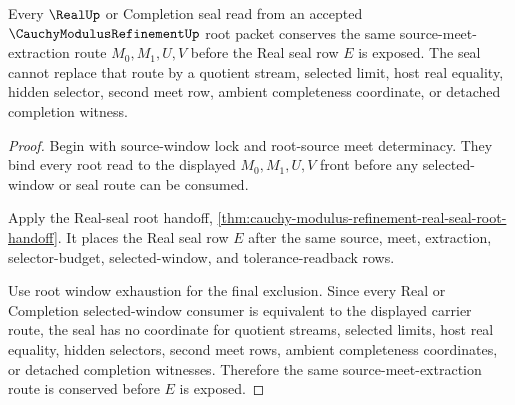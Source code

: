 \begin{theorem}
\label{thm:cauchy-modulus-refinement-real-seal-source-conservation}
Every $\RealUp$ or Completion seal read from an accepted $\CauchyModulusRefinementUp$ root packet conserves the same source-meet-extraction route $M_0,M_1,U,V$ before the Real seal row $E$ is exposed. The seal cannot replace that route by a quotient stream, selected limit, host real equality, hidden selector, second meet row, ambient completeness coordinate, or detached completion witness.
\end{theorem}
\begin{proof}
Begin with source-window lock and root-source meet determinacy. They bind every root read to the displayed $M_0,M_1,U,V$ front before any selected-window or seal route can be consumed.

Apply the Real-seal root handoff, \autoref{thm:cauchy-modulus-refinement-real-seal-root-handoff}. It places the Real seal row $E$ after the same source, meet, extraction, selector-budget, selected-window, and tolerance-readback rows.

Use root window exhaustion for the final exclusion. Since every Real or Completion selected-window consumer is equivalent to the displayed carrier route, the seal has no coordinate for quotient streams, selected limits, host real equality, hidden selectors, second meet rows, ambient completeness coordinates, or detached completion witnesses. Therefore the same source-meet-extraction route is conserved before $E$ is exposed.
\end{proof}

